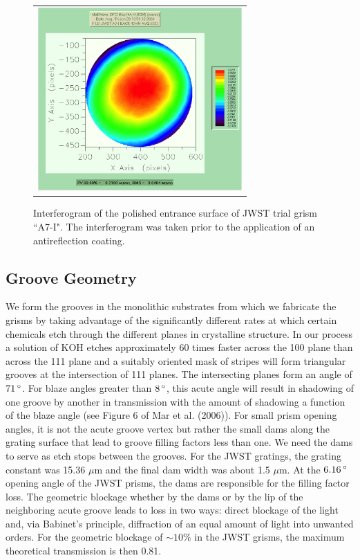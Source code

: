    \begin{figure}
   \begin{center}
   \begin{tabular}{c}
   \includegraphics[height=7cm]{chSPIE_2010_JWST/figs/A7I_entrance_uncoat.png}
   \end{tabular}
   \end{center}
   \caption[A7-I interferogram] {\label{fig:im2}  Interferogram of the polished entrance surface of JWST trial grism ``A7-I".  The interferogram was taken prior to the application of an antireflection coating. }
   \end{figure} 

\subsection{Groove Geometry}
We form the grooves in the monolithic substrates from which we fabricate the grisms by taking advantage of the significantly different rates at which certain chemicals etch through the different planes in crystalline structure\cite{2007ApOpt..46.3400M,Tsang1975}.  In our process a solution of KOH etches approximately 60 times faster across the 100 plane than across the 111 plane and a suitably oriented mask of stripes will form triangular grooves at the intersection of 111 planes.  The intersecting planes form an angle of $71\,^{\circ}{\rm}$.  For blaze angles greater than $8\,^{\circ}{\rm}$, this acute angle will result in shadowing of one groove by another in transmission with the amount of shadowing a function of the blaze angle (see Figure 6 of Mar et al. (2006)\cite{Mar06}).  For small prism opening angles, it is not the acute groove vertex but rather the small dams along the grating surface that lead to groove filling factors less than one.  We need the dams to serve as etch stops between the grooves.  For the JWST gratings, the grating constant was 15.36 $\mu$m and the final dam width was about 1.5 $\mu$m.  At the $6.16 \,^{\circ}{\rm}$ opening angle of the JWST prisms, the dams are responsible for the filling factor loss.  The geometric blockage whether by the dams or by the lip of the neighboring acute groove leads to loss in two ways:  direct blockage of the light and, via Babinet's principle, diffraction of an equal amount of light into unwanted orders.  For the geometric blockage of $\sim10\%$ in the JWST grisms, the maximum theoretical transmission is then 0.81.  

